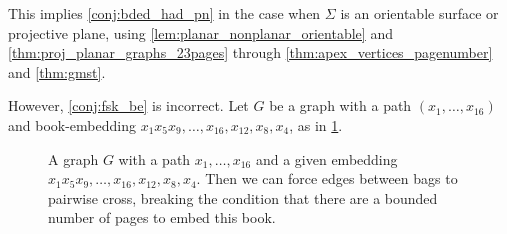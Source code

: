 This implies \cref{conj:bded_had_pn} in the case when $\Sigma$ is an orientable surface or projective plane, using \cref{lem:planar_nonplanar_orientable} and \cref{thm:proj_planar_graphs_23pages} through \cref{thm:apex_vertices_pagenumber} and \cref{thm:gmst}. 

However, \cref{conj:fsk_be} is incorrect. Let $G$ be a graph with a path $(x_1, \ldots, x_{16})$ and book-embedding $x_1 x_5 x_9, \ldots, x_{16}, x_{12}, x_{8}, x_{4}$, as in \cref{fig:counterexample_2}.

\begin{figure}[h!]
	\centering
	
	\caption[Counterexample to bounded number of colours]{A graph $G$ with a path $x_1, \ldots, x_{16}$ and a given embedding $x_1 x_5 x_9, \ldots, x_{16}, x_{12}, x_{8}, x_{4}$. Then we can force edges between bags to pairwise cross, breaking the condition that there are a bounded number of pages to embed this book.}\label{fig:counterexample_2}
\end{figure}